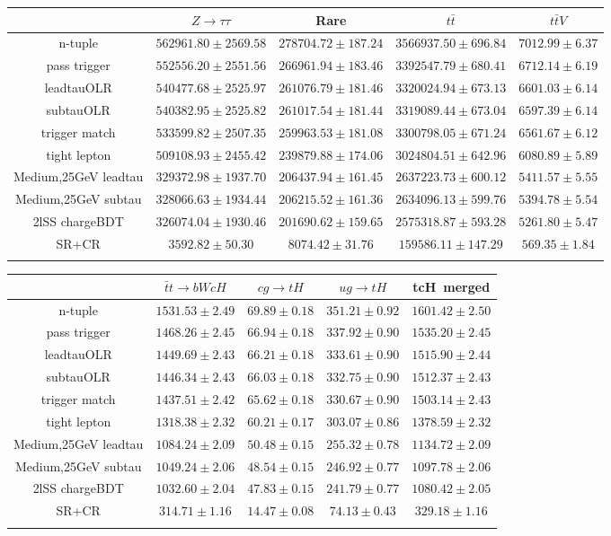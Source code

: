 \begin{tabular}{ccccc} \toprule\toprule
 & $Z\to \tau\tau$ & Rare & $t\bar{t}$ & $t\bar{t}V$\\\midrule
n-tuple & $562961.80\pm2569.58$ & $278704.72\pm187.24$ & $3566937.50\pm696.84$ & $7012.99\pm6.37$\\
pass trigger & $552556.20\pm2551.56$ & $266961.94\pm183.46$ & $3392547.79\pm680.41$ & $6712.14\pm6.19$\\
leadtauOLR & $540477.68\pm2525.97$ & $261076.79\pm181.46$ & $3320024.94\pm673.13$ & $6601.03\pm6.14$\\
subtauOLR & $540382.95\pm2525.82$ & $261017.54\pm181.44$ & $3319089.44\pm673.04$ & $6597.39\pm6.14$\\
trigger match & $533599.82\pm2507.35$ & $259963.53\pm181.08$ & $3300798.05\pm671.24$ & $6561.67\pm6.12$\\
tight lepton & $509108.93\pm2455.42$ & $239879.88\pm174.06$ & $3024804.51\pm642.96$ & $6080.89\pm5.89$\\
Medium,25GeV leadtau & $329372.98\pm1937.70$ & $206437.94\pm161.45$ & $2637223.73\pm600.12$ & $5411.57\pm5.55$\\
Medium,25GeV subtau & $328066.63\pm1934.44$ & $206215.52\pm161.36$ & $2634096.13\pm599.76$ & $5394.78\pm5.54$\\
2lSS chargeBDT & $326074.04\pm1930.46$ & $201690.62\pm159.65$ & $2575318.87\pm593.28$ & $5261.80\pm5.47$\\
SR+CR & $3592.82\pm50.30$ & $8074.42\pm31.76$ & $159586.11\pm147.29$ & $569.35\pm1.84$\\
\bottomrule\bottomrule\\
\end{tabular}
\begin{tabular}{ccccc} \toprule\toprule
 & $\bar{t}t\to bWcH$ & $cg\to tH$ & $ug\to tH$ & tcH~merged\\\midrule
n-tuple & $1531.53\pm2.49$ & $69.89\pm0.18$ & $351.21\pm0.92$ & $1601.42\pm2.50$\\
pass trigger & $1468.26\pm2.45$ & $66.94\pm0.18$ & $337.92\pm0.90$ & $1535.20\pm2.45$\\
leadtauOLR & $1449.69\pm2.43$ & $66.21\pm0.18$ & $333.61\pm0.90$ & $1515.90\pm2.44$\\
subtauOLR & $1446.34\pm2.43$ & $66.03\pm0.18$ & $332.75\pm0.90$ & $1512.37\pm2.43$\\
trigger match & $1437.51\pm2.42$ & $65.62\pm0.18$ & $330.67\pm0.90$ & $1503.14\pm2.43$\\
tight lepton & $1318.38\pm2.32$ & $60.21\pm0.17$ & $303.07\pm0.86$ & $1378.59\pm2.32$\\
Medium,25GeV leadtau & $1084.24\pm2.09$ & $50.48\pm0.15$ & $255.32\pm0.78$ & $1134.72\pm2.09$\\
Medium,25GeV subtau & $1049.24\pm2.06$ & $48.54\pm0.15$ & $246.92\pm0.77$ & $1097.78\pm2.06$\\
2lSS chargeBDT & $1032.60\pm2.04$ & $47.83\pm0.15$ & $241.79\pm0.77$ & $1080.42\pm2.05$\\
SR+CR & $314.71\pm1.16$ & $14.47\pm0.08$ & $74.13\pm0.43$ & $329.18\pm1.16$\\
\bottomrule\bottomrule\\
\end{tabular}
